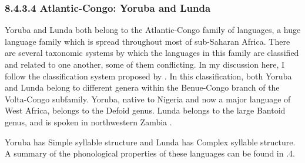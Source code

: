 \subsubsection{\textbf{8.4.3.4} \textbf{Atlantic-Congo:} \textbf{Yoruba} \textbf{and} \textbf{Lunda}}

  Yoruba and Lunda both belong to the Atlantic-Congo family of languages, a huge language family which is spread throughout most of sub-Saharan Africa. There are several taxonomic systems by which the languages in this family are classified and related to one another, some of them conflicting. In my discussion here, I follow the classification system proposed by \citet{Williamson1989}. In this classification, both Yoruba and Lunda belong to different genera within the Benue-Congo branch of the Volta-Congo subfamily. Yoruba, native to Nigeria and now a major language of West Africa, belongs to the Defoid genus. Lunda belongs to the large Bantoid genus, and is spoken in northwestern Zambia \citep{Kawasha2003}.

  Yoruba has Simple syllable structure and Lunda has Complex syllable structure. A summary of the phonological properties of these languages can be found in .4.

